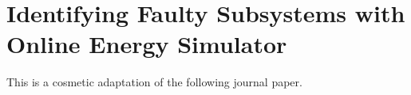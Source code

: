 
\chapter[Online Energy Simulator]%
{Identifying Faulty Subsystems with Online Energy Simulator}
\label{chap:publications:second-publication}

\begin{refsegment}

This  is a cosmetic adaptation of the following journal paper.




\iftoggle{separatebibliography}{
    \printbibliography[
        heading=subbibliography,
        segment=\therefsegment,
    ]
}{}
\end{refsegment}
